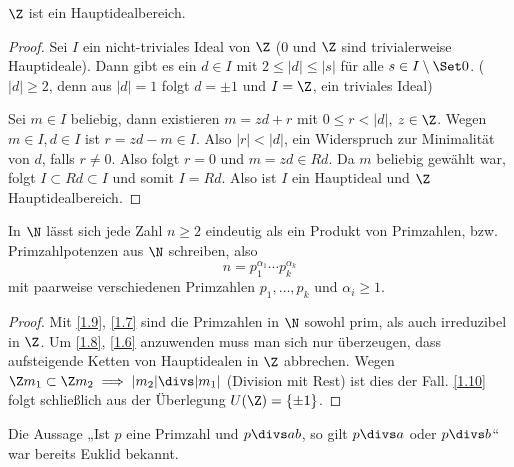 \begin{lem} \label{1.9}
	$\Z$ ist ein Hauptidealbereich.
	\begin{proof}
		Sei $I$ ein nicht-triviales Ideal von $\Z$ ($0$ und $\Z$ sind trivialerweise Hauptideale).
		Dann gibt es ein $d \in I$ mit $2 \le |d| \le |s|$ für alle $s \in I \setminus \Set 0$.
		($|d| \ge 2$, denn aus $|d|=1$ folgt $d = \pm 1$ und $I = \Z$, ein triviales Ideal)

		Sei $m \in I$ beliebig, dann existieren $m = zd + r$ mit $0 \le r < |d|$, $z \in \Z$.
		Wegen $m \in I, d\in I$ ist $r = zd - m \in I$.
		Also $|r| < |d|$, ein Widerspruch zur Minimalität von $d$, falls $r \neq 0$.
		Also folgt $r = 0$ und $m = zd \in Rd$.
		Da $m$ beliebig gewählt war, folgt $I \subset Rd \subset I$ und somit $I = Rd$.
		Also ist $I$ ein Hauptideal und $\Z$ Hauptidealbereich.
	\end{proof}
\end{lem}

\begin{st} \label{1.10}
	In $\N$ lässt sich jede Zahl $n \ge 2$ eindeutig als ein Produkt von Primzahlen, bzw. Primzahlpotenzen aus $\N$ schreiben, also
	\[
		n = p_1^{\alpha_1} \dotsb p_k^{\alpha_k}
	\]
	mit paarweise verschiedenen Primzahlen $p_1, \dotsc, p_k$ und $\alpha_i \ge 1$.
	\begin{proof}
		Mit \ref{1.9}, \ref{1.7} sind die Primzahlen in $\N$ sowohl prim, als auch irreduzibel in $\Z$.
		Um \ref{1.8}, \ref{1.6} anzuwenden muss man sich nur überzeugen, dass aufsteigende Ketten von Hauptidealen in $\Z$ abbrechen.
		Wegen $\Z m_1 \subset \Z m_2 \implies |m_2| \divs  |m_1|$ (Division mit Rest) ist dies der Fall.
		\ref{1.10} folgt schließlich aus der Überlegung $U(\Z) = \{ \pm 1 \}$.
	\end{proof}
\end{st}

\begin{nt*}
	Die Aussage „Ist $p$ eine Primzahl und $p \divs  ab$, so gilt $p \divs  a$ oder $p \divs  b$“ war bereits Euklid bekannt.
\end{nt*}

